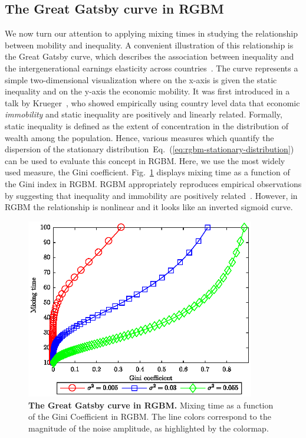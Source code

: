 \documentclass[11pt]{article}
\newcommand{\eref}[1]{Eq.~(\ref{eq:#1})}
\newcommand{\fref}[1]{Fig.~\ref{fig:#1}}
\newcommand{\be}{\begin{equation}}
\newcommand{\ee}{\end{equation}}
\numberwithin{equation}{section}
\begin{document}
\subsection{The Great Gatsby curve in RGBM}
We now turn our attention to applying mixing times in studying the relationship between mobility and inequality. A convenient illustration of this relationship is the Great Gatsby curve, which describes the association between inequality and the intergenerational earnings elasticity across countries~\citep{krueger2012,corak2013}. The curve represents a simple two-dimensional visualization where on the x-axis is given the static inequality and on the y-axis the economic mobility. It was first introduced in a talk by Krueger~\cite{krueger2012}, who showed empirically using country level data that economic \textit{immobility} and static inequality are  positively and linearly related.
Formally, static inequality is defined as the extent of concentration in the distribution of wealth among the population. Hence, various measures which quantify the dispersion of the stationary distribution~\eref{rgbm-stationary-distribution} can be used to evaluate this concept in RGBM. Here, we use the most widely used measure, the Gini coefficient.
\fref{rgbm-great-gatsby} displays mixing time as a function of the Gini index in RGBM. RGBM appropriately reproduces empirical observations by suggesting that inequality and immobility are positively related~\citep{krueger2012}. However, in RGBM the relationship is nonlinear and it looks like an inverted sigmoid curve.

\begin{figure}[!htb]
\centering
\includegraphics[width=10cm]{figs/fig_great_gatsby.eps}
\caption{\textbf{The Great Gatsby curve in RGBM.} Mixing time as a function of the Gini Coefficient in RGBM. The line colors correspond to the magnitude of the noise amplitude, as highlighted by the colormap.
\label{fig:rgbm-great-gatsby}}
\end{figure}
\end{document}
